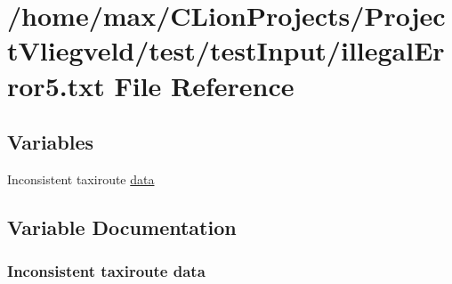\hypertarget{illegalError5_8txt}{}\section{/home/max/\+C\+Lion\+Projects/\+Project\+Vliegveld/test/test\+Input/illegal\+Error5.txt File Reference}
\label{illegalError5_8txt}
\subsection*{Variables}
\begin{DoxyCompactItemize}
\item 
Inconsistent taxiroute \hyperlink{illegalError5_8txt_a2db91b8ae553a8888179c8dd6e74453f}{data}
\end{DoxyCompactItemize}


\subsection{Variable Documentation}
\subsubsection[{\texorpdfstring{data}{data}}]{\setlength{\rightskip}{0pt plus 5cm}Inconsistent taxiroute data}\hypertarget{illegalError5_8txt_a2db91b8ae553a8888179c8dd6e74453f}{}\label{illegalError5_8txt_a2db91b8ae553a8888179c8dd6e74453f}
